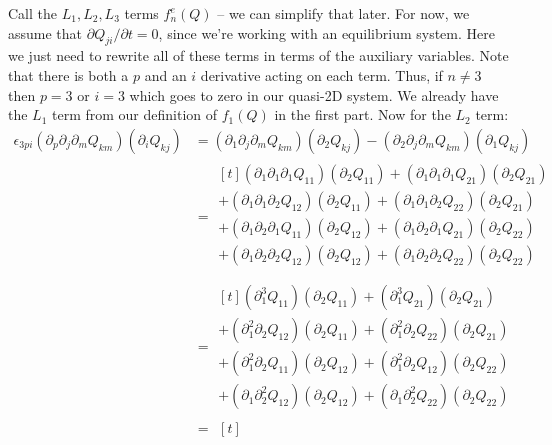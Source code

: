 \documentclass[reqno]{article}
\begin{document}
	Call the $L_1, L_2, L_3$ terms $f^e_n(Q)$ -- we can simplify that later. 
	For now, we assume that $\partial Q_{ji}/\partial t = 0$, since we're working with an equilibrium system. 
	Here we just need to rewrite all of these terms in terms of the auxiliary variables. 
	Note that there is both a $p$ and an $i$ derivative acting on each term.
	Thus, if $n \neq 3$ then $p = 3$ or $i = 3$ which goes to zero in our quasi-2D system.
	We already have the $L_1$ term from our definition of $f_1(Q)$ in the first part.
	Now for the $L_2$ term:
	\begin{equation}
	\begin{split}
		\epsilon_{3pi} (\partial_p \partial_j \partial_m Q_{km}) (\partial_i Q_{kj})
		&= (\partial_1 \partial_j \partial_m Q_{km}) (\partial_2 Q_{kj})
		- (\partial_2 \partial_j \partial_m Q_{km}) (\partial_1 Q_{kj}) \\
		&= 
	\begin{multlined}[t]
		(\partial_1 \partial_1 \partial_1 Q_{11})(\partial_2 Q_{11})
		+ (\partial_1 \partial_1 \partial_1 Q_{21}) (\partial_2 Q_{21}) \\
		+ (\partial_1 \partial_1 \partial_2 Q_{12}) (\partial_2 Q_{11})
		+ (\partial_1 \partial_1 \partial_2 Q_{22}) (\partial_2 Q_{21}) \\
		+ (\partial_1 \partial_2 \partial_1 Q_{11}) (\partial_2 Q_{12}) 
		+ (\partial_1 \partial_2 \partial_1 Q_{21}) (\partial_2 Q_{22}) \\
		+ (\partial_1 \partial_2 \partial_2 Q_{12}) (\partial_2 Q_{12}) 
		+ (\partial_1 \partial_2 \partial_2 Q_{22}) (\partial_2 Q_{22}) \\
	\end{multlined} \\
		&=
	\begin{multlined}[t]
		(\partial_1^3 Q_{11})(\partial_2 Q_{11}) 
		+ (\partial_1^3 Q_{21}) (\partial_2 Q_{21}) \\
		+ (\partial_1^2 \partial_2 Q_{12}) (\partial_2 Q_{11})
		+ (\partial_1^2 \partial_2 Q_{22}) (\partial_2 Q_{21}) \\
		+ (\partial_1^2 \partial_2 Q_{11}) (\partial_2 Q_{12})
		+ (\partial_1^2 \partial_2 Q_{12}) (\partial_2 Q_{22}) \\
		+ (\partial_1 \partial_2^2 Q_{12}) (\partial_2 Q_{12})
		+ (\partial_1 \partial_2^2 Q_{22}) (\partial_2 Q_{22})
	\end{multlined} \\
		&=
	\begin{multlined}[t]
		
	\end{multlined}
	\end{split}
	\end{equation}
	
\end{document}
